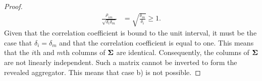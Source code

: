 \documentclass[11pt]{article}
\newcommand{\E}{\mathbb{E}}
\theoremstyle{definition}
\theoremstyle{definition}
\def\one{{\bf 1}}
\def\bSigma{{\bf \Sigma}}
\def\w{{\bf w}}
\def\X{{\bf X}}
\def\E{{\mathbb E}}
\def\diag{\text{diag}}
\def\diag{\text{diag}}
\begin{document}
\begin{proof}
\begin{align*}
\frac{\rho_{im}}{\sqrt{\delta_i \delta_m}} &= \sqrt{ \frac{\delta_{m}}{\delta_i }} \geq 1.
\end{align*}
Given that the correlation coefficient is bound to the unit interval, it must be the case that $\delta_i = \delta_m$ and that the correlation coefficient is equal to one. This means that the $i$th and $m$th columns of $\bSigma$ are identical. Consequently, the columns of $\bSigma$ are not linearly independent. Such a matrix cannot be inverted to form the revealed aggregator. This means that case b) is not possible. 


\end{proof}
\end{document}
